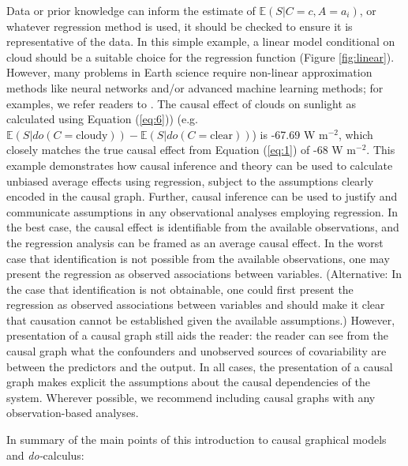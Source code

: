 \documentclass[12pt]{article}
\begin{document}
Data or prior knowledge can inform the estimate of
$\mathbb{E}(S | C=c, A=a_i)$, or whatever regression method
is used, it should be checked to ensure it is representative of the
data. In this simple example, a linear model conditional on cloud
should be a suitable choice for the regression function (Figure
\ref{fig:linear}). However, many  problems in Earth
science require non-linear approximation methods like neural
networks and/or advanced machine learning methods; for examples, we
refer readers to \citep{bishop2006pattern}. The causal effect of
clouds on sunlight as calculated using Equation (\ref{eq:6})) (e.g.
$\mathbb{E}(S | do(C = \text{cloudy})) - \mathbb{E}(S | do(C =
\text{clear}))$) is -67.69 W m$^{-2}$, which closely matches the true
causal effect from Equation (\ref{eq:1}) of -68 W m$^{-2}$. This
example demonstrates how causal inference and theory can be used to
calculate unbiased average effects using regression, subject to the
assumptions clearly encoded in the causal graph. Further, causal
inference can be used to justify and communicate assumptions in any
observational analyses employing regression. In the best case, the
causal effect is identifiable from the available observations, and the
regression analysis can be framed as an average causal effect. In the worst case that identification is not possible
from the available observations, one may present the regression as
observed associations between variables. (Alternative: In the
case that identification is not obtainable, one could first present
the regression as observed associations between variables and should
make it clear that causation cannot be established given the available
assumptions.) However, presentation of a
causal graph still aids the reader: the reader can see from the causal
graph what the confounders and unobserved sources of covariability are
between the predictors and the output. In all cases, the presentation
of a causal graph makes explicit the assumptions about the causal
dependencies of the system. Wherever possible, we recommend including
causal graphs with any observation-based analyses.

In summary of the main points of this introduction to causal graphical
models and \textit{do-}calculus:
\end{document}
